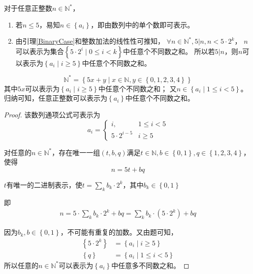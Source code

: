 \begin{questions}
\begin{solution}
\begin{parts}
{                对于任意正整数$ n \in \mathbb{N}^*$，
                \begin{enumerate}
                    \item {
                          若$n\leq 5$，易知$n \in \left\{ a_i \right\}$，即由数列中的单个数即可表示。
                          }
                    \item {
                          由引理\ref{BinaryCase}和整数加法的线性性可推知，
                          $\forall n \in \mathbb{N}^* , 5 | n, n < 5 \cdot 2^k$，
                          $n$可以表示为集合$\left\{ 5 \cdot 2^i \mid 0 \leq i < k \right\}$中任意个不同数之和。
                          所以若$5|n$，则$n$可以表示为$\left\{ a_i \mid i \geq 5 \right\}$中任意个不同数之和。\label{timesOfFive}
                          }
                \end{enumerate}
                $$\mathbb{N}^* = \left\{ 5x+y \mid x \in \mathbb{N}, y\in \left\{0,1,2,3,4 \right\} \right\}$$
                其中$5x$可以表示为$\left\{ a_i \mid i \geq 5 \right\}$中任意个不同数之和；
                又$n \in \left\{ a_i \mid 1 \leq i < 5 \right\}$。
                归纳可知，任意正整数可以表示为$\left\{ a_i \right\}$中任意个不同数之和。
            }
        \end{parts}
    \end{solution}

    \begin{solution}
        \begin{proof}
            该数列通项公式可表示为$$ a_i =
                \begin{cases}
                    i,              & 1 \leq i < 5 \\
                    5 \cdot 2^{i-5} & i \geq 5
                \end{cases} $$

            对任意的$n \in \mathbb{N}^*$，存在唯一一组$(t,b,q)$满足$t\in \mathbb{N}, b\in \left\{0,1 \right\}, q \in \left\{ 1,2,3,4\right\}$，使得$$n = 5t+bq$$

            $t$有唯一的二进制表示，使$t = \sum_{k}{b_k \cdot 2^k}$，其中$b_k \in \left\{0,1\right\}$

            即\begin{align*}
                n = 5 \cdot \sum_{k}{b_k \cdot 2^k} + bq
                = \sum_{k}{b_k \cdot (5 \cdot 2^k)} + bq
            \end{align*}

            因为$b_k, b \in \left\{0,1\right\}$，不可能有重复的加数。又由题可知，
            \begin{align*}
                \left\{5 \cdot 2^k \right\} & = \left\{a_i \mid i \geq 5 \right\}     \\
                \left\{q \right\}           & = \left\{a_i \mid 1 \leq i < 5 \right\}
            \end{align*}
            所以任意的$n \in \mathbb{N}^*$可以表示为$\left\{ a_i \right\}$中任意多不同数之和。
        \end{proof}
    \end{solution}


\end{questions}
